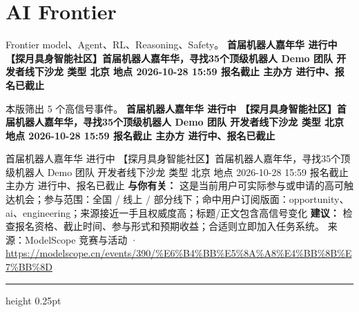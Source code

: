 \documentclass[10.5pt]{ctexart}
\begin{document}
\section*{AI Frontier}
{\color{ormuted} Frontier model、Agent、RL、Reasoning、Safety。}
\vspace{2mm}
{\LARGE\bfseries 首届机器人嘉年华 进行中 【探月具身智能社区】首届机器人嘉年华，寻找35个顶级机器人 Demo 团队 开发者线下沙龙 类型 北京 地点 2026-10-28 15:59 报名截止 主办方 进行中、报名已截止}\par
\vspace{1mm}
{\color{ormuted} 本版筛出 5 个高信号事件。}
\vspace{3mm}
{\Large\bfseries 首届机器人嘉年华 进行中 【探月具身智能社区】首届机器人嘉年华，寻找35个顶级机器人 Demo 团队 开发者线下沙龙 类型 北京 地点 2026-10-28 15:59 报名截止 主办方 进行中、报名已截止}\par
首届机器人嘉年华 进行中 【探月具身智能社区】首届机器人嘉年华，寻找35个顶级机器人 Demo 团队 开发者线下沙龙 类型 北京 地点 2026-10-28 15:59 报名截止 主办方 进行中、报名已截止
\textbf{与你有关：} 这是当前用户可实际参与或申请的高可触达机会；参与范围：全国 / 线上 / 部分线下；命中用户订阅版面：opportunity、ai、engineering；来源接近一手且权威度高；标题/正文包含高信号变化
\textbf{建议：} 检查报名资格、截止时间、参与形式和预期收益；合适则立即加入任务系统。
{\footnotesize\color{ormuted} 来源：ModelScope 竞赛与活动 · \url{https://modelscope.cn/events/390/%E6%B4%BB%E5%8A%A8%E4%BB%8B%E7%BB%8D}}
\vspace{4mm}
\hrule height 0.25pt
\vspace{3mm}
\end{document}
